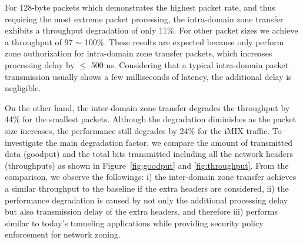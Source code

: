 For 128-byte packets which demonstrates the highest packet rate, and thus requiring the most
extreme packet processing, the intra-domain zone transfer exhibits a throughput degradation
of only 11\%. For other packet sizes we achieve a throughput of 97 $\sim$ 100\%. These
results are expected because \tps only perform zone authorization for intra-domain zone transfer
packets, which increases processing delay by $\leq$ 500 ns. Considering that
a typical intra-domain packet transmission usually shows a few milliseconds of latency, the
additional delay is negligible.

On the other hand, the inter-domain zone transfer degrades the throughput by 44\% for the
smallest packets. Although the degradation diminishes as the packet size increases, the
performance still degrades by 24\% for the iMIX traffic. To investigate the main degradation
factor, we compare the amount of transmitted data (goodput) and the total bits transmitted
including all the network headers (throughputs) as shown in Figure~\ref{fig:goodput} and
\ref{fig:throughput}. From the comparison, we observe the followings: i) the inter-domain
zone transfer achieves a similar throughput to the baseline if the extra headers are considered,
ii) the performance degradation is caused by not only the additional processing delay but also
transmission delay of the extra headers, and therefore iii) \name performs similar to
today's tunneling applications while providing security policy enforcement for network
zoning.







